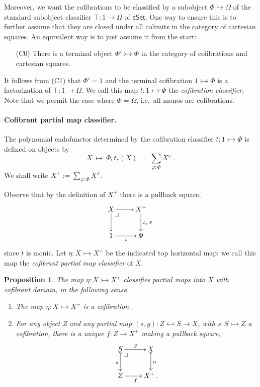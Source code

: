 \documentclass[12pt]{article}
\makeatletter
\newcommand{\pbcorner}[1][dr]{\save*!/#1-1.2pc/#1:(-1,1)@^{|-}\restore}
\newcommand{\hook}{\ensuremath{\hookrightarrow}}
\newcommand{\mono}{\ensuremath{\rightarrowtail}}
\newcommand{\ra}{\ensuremath{\rightarrow}}
\newtheorem{proposition}[theorem]{Proposition}
\theoremstyle{remark}
\theoremstyle{definition}
\makeatother
\begin{document}
Moreover, we want the cofibrations to be classified by a  subobject $\Phi \hook \Omega$ of the standard subobject classifier $\top : 1 \ra \Omega$ of $\mathsf{cSet}$.  One way to ensure this is to further assume that they are closed under all colimits in the category of cartesian squares.  An equivalent way is to just assume it from the start:

\begin{enumerate}
\item[(C0)] There is a terminal object $\Phi' \mono \Phi$ in the category of cofibrations and cartesian squares.
\end{enumerate}

It follows from (C1) that $\Phi' = 1$ and the terminal cofibration $1 \mono \Phi$ is a factorization of $\top : 1 \ra \Omega$.  We call this map $t:1 \mono \Phi$ the \emph{cofibration classifier}.  Note that we permit the case where $\Phi = \Omega$, i.e.\ all monos are cofibrations.

\paragraph{Cofibrant partial map classifier.}
The polynomial endofunctor \cite{GG} determined by the cofibration classifier $t : 1 \mono \Phi$ is defined on objects by
\[
X\ \mapsto\ \Phi_!\,t_*(X)\ =\ \sum_{\varphi: \Phi}X^{\varphi}\,.
\]
We shall write $X^+ := \sum_{\varphi: \Phi}X^{\varphi}$.

Observe that by the definition of $X^+$ there is a pullback square,
\[
\xymatrix{
X \ar[d]\pbcorner \ar[r] & X^+ \ar[d]^{t_*X}\\
1 \ar[r]_{t} & \Phi
}
\]
since $t$ is monic. Let $\eta : X\mono X^+$ be the indicated top horizontal map; we call this map the \emph{cofibrant partial map classifier} of $X$.
 
\begin{proposition}
The map $\eta : X\mono X^+$ classifies partial maps into $X$ with cofibrant domain, in the following sense.
\begin{enumerate}
\item The map $\eta : X\mono X^+$ is a cofibration.
\item For any object Z and any partial map $(s,g): Z\leftarrowtail S\ra X$, with $s : S\mono Z$ a cofibration, there is a unique $f:Z\ra X^+$ making a pullback square,
\[
\xymatrix{
S \ar@{>->}[d]_{s} \pbcorner \ar[r]^g & X \ar@{>->}[d]^{\eta}\\
Z \ar[r]_f & X^+\,.
}
\]
\end{enumerate}
\end{proposition}
\end{document}
